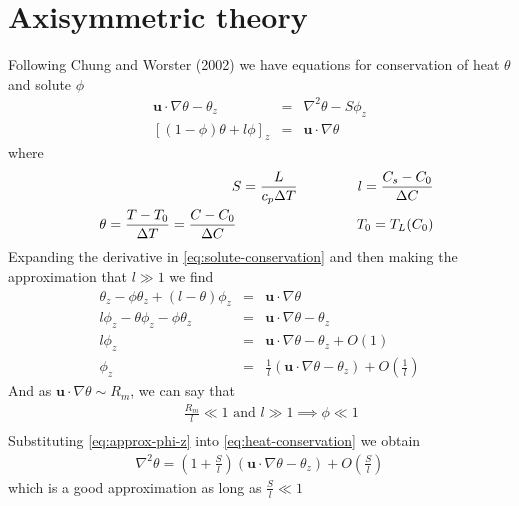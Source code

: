 \documentclass{article}
\begin{document}
\section{Axisymmetric theory}
\label{sec:some-theory}
Following Chung and Worster (2002) we have equations for conservation of heat $\theta$ and solute $\phi$
\begin{eqnarray}
\mathbf{u} \cdot \nabla \theta - \theta_z &=& \nabla^2 \theta - S \phi_z \label{eq:heat-conservation}\\
\left[ (1 - \phi) \theta + l \phi \right]_z &=& \mathbf{u} \cdot \nabla \theta \label{eq:solute-conservation}
\end{eqnarray}
where
\begin{eqnarray}
&&S = \frac{L}{c_p \Delta T} \hspace{10ex} l = \frac{C_s - C_0}{\Delta C} \\
&&\theta = \frac{T-T_0}{\Delta T} = \frac{C- C_0}{\Delta C} \hspace{20ex} T_0 = T_L(C_0)
\end{eqnarray}
Expanding the derivative in \eqref{eq:solute-conservation} and then making the approximation that $l \gg  1$ we find
\begin{eqnarray}
\theta_z - \phi \theta_z + (l-\theta) \phi_z &=& \mathbf{u} \cdot \nabla \theta \\
l \phi_z - \theta \phi_z - \phi \theta_z &=& \mathbf{u} \cdot \nabla \theta - \theta_z \\
l \phi_z &=& \mathbf{u} \cdot \nabla \theta - \theta_z + O(1) \\
\phi_ z &=& \frac{1}{l} \left( \mathbf{u} \cdot \nabla \theta - \theta_z \right) + O(\frac{1}{l}) \label{eq:approx-phi-z}
\end{eqnarray}
And as $\mathbf{u} \cdot \nabla \theta \sim R_m$, we can say that
\begin{eqnarray}
&&\frac{R_m}{l} \ll 1 \text{ and } l \gg 1 \implies \phi \ll 1 \\
\end{eqnarray}
Substituting \eqref{eq:approx-phi-z} into \eqref{eq:heat-conservation} we obtain
\begin{eqnarray}
\nabla^2 \theta = \left(1 + \frac{S}{l} \right) (\mathbf{u} \cdot \nabla \theta - \theta_z ) + O\left(\frac{S}{l} \right)
\end{eqnarray}
which is a good approximation as long as $\frac{S}{l} \ll 1$
\end{document}
